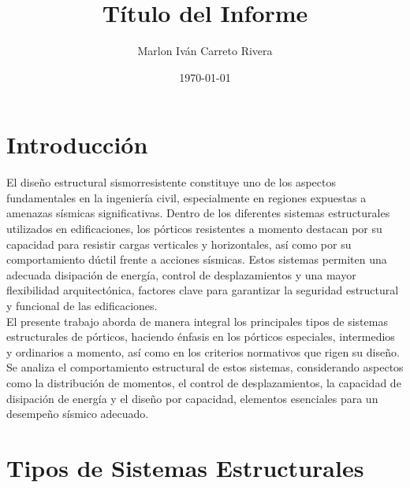 \documentclass[14pt,letterpaper]{extarticle}
\title{\textbf{Título del Informe}}
\author{Marlon Iván Carreto Rivera}
\date{\today}
\begin{document}
	
		
	\thispagestyle{empty}


	\newpage
	
	
	
	
	
	
	\renewcommand{\contentsname}{Contenido}
	\tableofcontents
	\newpage
	

	
	
	\section*{Introducción }
	
	El diseño estructural sismorresistente constituye uno de los aspectos fundamentales en la ingeniería civil, especialmente en regiones expuestas a amenazas sísmicas significativas. Dentro de los diferentes sistemas estructurales utilizados en edificaciones, los pórticos resistentes a momento destacan por su capacidad para resistir cargas verticales y horizontales, así como por su comportamiento dúctil frente a acciones sísmicas. Estos sistemas permiten una adecuada disipación de energía, control de desplazamientos y una mayor flexibilidad arquitectónica, factores clave para garantizar la seguridad estructural y funcional de las edificaciones. 	\\
	El presente trabajo aborda de manera integral los principales tipos de sistemas estructurales de pórticos, haciendo énfasis en los pórticos especiales, intermedios y ordinarios a momento, así como en los criterios normativos que rigen su diseño. Se analiza el comportamiento estructural de estos sistemas, considerando aspectos como la distribución de momentos, el control de desplazamientos, la capacidad de disipación de energía y el diseño por capacidad, elementos esenciales para un desempeño sísmico adecuado.
	
		\newpage
	\section{Tipos de Sistemas Estructurales}
\end{document}
